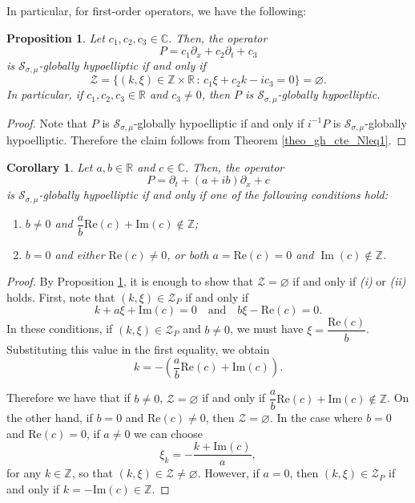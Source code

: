 \documentclass[11pt,reqno]{amsart}
\numberwithin{equation}{section}
\newtheorem{corollary}[theorem]{Corollary}
\newtheorem{prop}[theorem]{Proposition}
\theoremstyle{definition}
\theoremstyle{definition}
\newcommand{\R}{\mathbb{R}}
\newcommand{\Z}{\mathbb{Z}}
\newcommand{\Real}{\mathrm{Re}}
\newcommand{\Imag}{\mathrm{Im}}
\begin{document}
In particular, for first-order operators, we have the following:

\begin{prop}\label{dtaibdx}
    Let $c_1,c_2,c_3\in\mathbb{C}$. Then, the operator
    \[P=c_1\partial_x+c_2\partial_t+c_3\]
    is $\mathcal{S}_{\sigma,\mu}$-globally hypoelliptic if and only if
    \[\mathcal{Z}=\{(k,\xi)\in\Z\times\R\,:\, c_1\xi+c_2k-ic_3=0\}=\varnothing.\]
    In particular, if $c_1,c_2,c_3\in\R$ and $c_3\neq 0$, then $P$ is $\mathcal{S}_{\sigma,\mu}$-globally hypoelliptic.
\end{prop}
\begin{proof}
   Note that $P$ is $\mathcal{S}_{\sigma,\mu}$-globally hypoelliptic if and only if $i^{-1}P$ is $\mathcal{S}_{\sigma,\mu}$-globally hypoelliptic. Therefore the claim follows from Theorem \ref{theo_gh_cte_Nleq1}.
\end{proof}

\begin{corollary}\label{coro_cte}
    Let $a,b\in\R$ and $c\in\mathbb{C}$. Then, the operator
    \[P=\partial_t+(a+ib)\partial_x+c\]
    is $\mathcal{S}_{\sigma,\mu}$-globally hypoelliptic if and only if one of the following conditions hold:
    \begin{enumerate}
        \item[(i)] $b\neq 0$ and $\dfrac{a}{b}\Real(c)+\Imag(c)\notin\mathbb{Z}$;
        \item[(ii)] $b=0$ and either $\Real(c)\neq 0$, or both $a=\Real(c)=0$ and $\operatorname{Im}(c)\notin\Z$.
    \end{enumerate}
\end{corollary}
\begin{proof}
    By Proposition \ref{dtaibdx}, it is enough to show that $\mathcal{Z}=\varnothing$ if and only if {\it (i)} or {\it (ii)} holds. First, note that $(k,\xi)\in\mathcal{Z}_P$ if and only if
    \[k+a\xi+\Imag(c)=0\quad\text{and}\quad b\xi-\Real(c)=0.\]
    In these conditions, if $(k,\xi)\in\mathcal{Z}_P$ and $b\neq 0$, we must have $\xi=\dfrac{\Real(c)}{b}$. Substituting this value in the first equality, we obtain
    \[k=-\left(\dfrac{a}{b}\Real(c)+\Imag(c)\right).\]
    
    Therefore we have that if $b\neq 0$, $\mathcal{Z}=\varnothing$ if and only if $\dfrac{a}{b}\Real(c)+\Imag(c)\not\in\Z$. On the other hand, if $b=0$ and $\Real(c)\neq 0$, then $\mathcal{Z}=\varnothing$. In the case where $b=0$ and $\Real(c)=0$, if $a\neq 0$ we can choose
    \[\xi_k=-\dfrac{k+\Imag(c)}{a},\]
    for any $k\in\Z$,  so that $(k,\xi)\in \mathcal{Z}\neq\varnothing$. However, if $a=0$, then $(k,\xi)\in\mathcal{Z}_P$ if and only if $k=-\Imag(c)\in\Z$. 
\end{proof}
\end{document}
